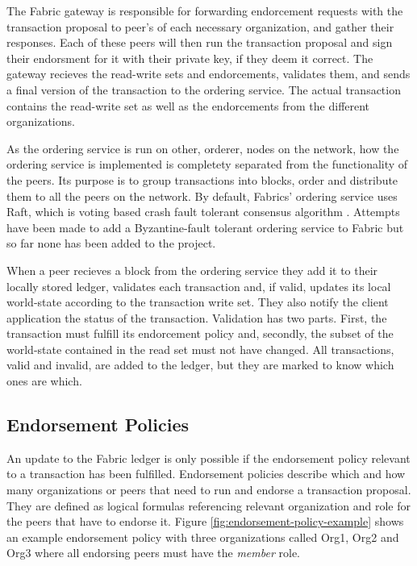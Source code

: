 \documentclass[english, biblatex, digitaloutput]{kththesis}
\begin{document}
The Fabric gateway is responsible for forwarding endorcement requests with the transaction proposal to peer's of each necessary organization, and gather their responses. Each of these peers will then run the transaction proposal and sign their endorsment for it with their private key, if they deem it correct. The  gateway recieves the read-write sets and endorcements, validates them, and sends a final version of the transaction to the ordering service. The actual transaction contains the read-write set as well as the endorcements from the different organizations.

As the ordering service is run on other, orderer, nodes on the network, how the ordering service is implemented is completety separated from the functionality of the peers. Its purpose is to group transactions into blocks, order and distribute them to all the peers on the network. By default, Fabrics' ordering service uses Raft, which is voting based crash fault tolerant consensus algorithm \cite{ongaro_raft_2014}. Attempts have been made to add a Byzantine-fault tolerant ordering service to Fabric \cite{barger_byzantine_2021} but so far none has been added to the project.

When a peer recieves a block from the ordering service they add it to their locally stored ledger, validates each transaction and, if valid, updates its local world-state according to the transaction write set. They also notify the client application the status of the transaction. Validation has two parts. First, the transaction must fulfill its endorcement policy and, secondly, the subset of the world-state contained in the read set must not have changed. All transactions, valid and invalid, are added to the ledger, but they are marked to know which ones are which.




\subsection{Endorsement Policies}

An update to the Fabric ledger is only possible if the endorsement policy relevant to a transaction has been fulfilled. Endorsement policies describe which and how many organizations or peers that need to run and endorse a transaction proposal. They are defined as logical formulas referencing relevant organization and role for the peers that have to endorse it. Figure \ref{fig:endorsement-policy-example} shows an example endorsement policy with three organizations called Org1, Org2 and Org3 where all endorsing peers must have the \textit{member} role.
\end{document}
